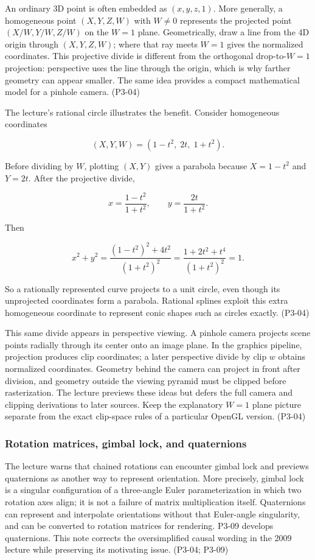 An ordinary 3D point is often embedded as \((x,y,z,1)\). More generally, a homogeneous point \((X,Y,Z,W)\) with \(W\ne0\) represents the projected point \((X/W,Y/W,Z/W)\) on the \(W=1\) plane. Geometrically, draw a line from the 4D origin through \((X,Y,Z,W)\); where that ray meets \(W=1\) gives the normalized coordinates. This projective divide is different from the orthogonal drop-to-\(W=1\) projection: perspective uses the line through the origin, which is why farther geometry can appear smaller. The same idea provides a compact mathematical model for a pinhole camera. (P3-04)

The lecture's rational circle illustrates the benefit. Consider homogeneous coordinates

\[
(X,Y,W)=(1-t^2,\;2t,\;1+t^2).
\]

Before dividing by \(W\), plotting \((X,Y)\) gives a parabola because \(X=1-t^2\) and \(Y=2t\). After the projective divide,

\[
x=\frac{1-t^2}{1+t^2},\qquad y=\frac{2t}{1+t^2}.
\]

Then

\[
x^2+y^2=\frac{(1-t^2)^2+4t^2}{(1+t^2)^2}
=\frac{1+2t^2+t^4}{(1+t^2)^2}=1.
\]

So a rationally represented curve projects to a unit circle, even though its unprojected coordinates form a parabola. Rational splines exploit this extra homogeneous coordinate to represent conic shapes such as circles exactly. (P3-04)

This same divide appears in perspective viewing. A pinhole camera projects scene points radially through its center onto an image plane. In the graphics pipeline, projection produces clip coordinates; a later perspective divide by clip \(w\) obtains normalized coordinates. Geometry behind the camera can project in front after division, and geometry outside the viewing pyramid must be clipped before rasterization. The lecture previews these ideas but defers the full camera and clipping derivations to later sources. Keep the explanatory \(W=1\) plane picture separate from the exact clip-space rules of a particular OpenGL version. (P3-04)

\subsubsection{Rotation matrices, gimbal lock, and quaternions}\label{03-visual-computing-i-ch001-rotation-matrices-gimbal-lock-and-quaternions}

The lecture warns that chained rotations can encounter gimbal lock and previews quaternions as another way to represent orientation. More precisely, gimbal lock is a singular configuration of a three-angle Euler parameterization in which two rotation axes align; it is not a failure of matrix multiplication itself. Quaternions can represent and interpolate orientations without that Euler-angle singularity, and can be converted to rotation matrices for rendering. P3-09 develops quaternions. This note corrects the oversimplified causal wording in the 2009 lecture while preserving its motivating issue. (P3-04; P3-09)

